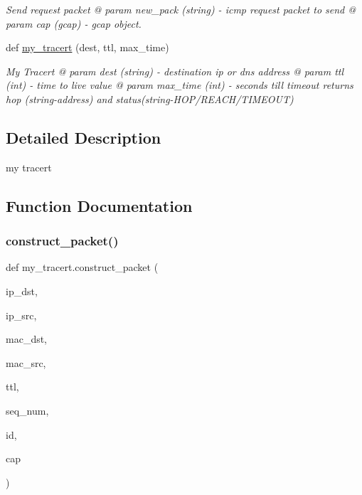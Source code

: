 \begin{DoxyCompactItemize}
\begin{DoxyCompactList}\small\item\em Send request packet @ param new\+\_\+pack (string) -\/ icmp request packet to send @ param cap (gcap) -\/ gcap object. \end{DoxyCompactList}\item 
def \hyperlink{namespacemy__tracert_a2dd00edf3b1b902f1c9658f042991fe3}{my\+\_\+tracert} (dest, ttl, max\+\_\+time)
\begin{DoxyCompactList}\small\item\em My Tracert @ param dest (string) -\/ destination ip or dns address @ param ttl (int) -\/ time to live value @ param max\+\_\+time (int) -\/ seconds till timeout returns hop (string-\/address) and status(string-\/\+H\+O\+P/\+R\+E\+A\+C\+H/\+T\+I\+M\+E\+O\+UT) \end{DoxyCompactList}\end{DoxyCompactItemize}


\subsection{Detailed Description}
\begin{DoxyVerb}my tracert \end{DoxyVerb}
 

\subsection{Function Documentation}
\mbox{\label{namespacemy__tracert_a55eea7ee1da325e6d2783a270a971eea}} 
\subsubsection{\texorpdfstring{construct\+\_\+packet()}{construct\_packet()}}
{\footnotesize\ttfamily def my\+\_\+tracert.\+construct\+\_\+packet (\begin{DoxyParamCaption}\item[{}]{ip\+\_\+dst,  }\item[{}]{ip\+\_\+src,  }\item[{}]{mac\+\_\+dst,  }\item[{}]{mac\+\_\+src,  }\item[{}]{ttl,  }\item[{}]{seq\+\_\+num,  }\item[{}]{id,  }\item[{}]{cap }\end{DoxyParamCaption})}



